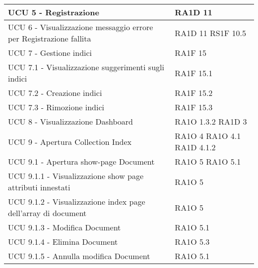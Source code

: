 \begin{center}
\begin{longtable}{ | p{5cm} | p{5cm} |}
            UCU 5 - Registrazione &  RA1D 11 \newline  \\ \hline      
            UCU 6 - Visualizzazione messaggio errore per Registrazione fallita &  RA1D 11 \newline  RS1F 10.5 \newline  \\ \hline      
            UCU 7 - Gestione indici &  RA1F 15 \newline  \\ \hline      
            UCU 7.1 - Visualizzazione suggerimenti sugli indici &  RA1F 15.1 \newline  \\ \hline      
            UCU 7.2 - Creazione indici &  RA1F 15.2 \newline  \\ \hline      
            UCU 7.3  - Rimozione indici &  RA1F 15.3 \newline  \\ \hline      
            UCU 8 - Visualizzazione Dashboard &  RA1O 1.3.2 \newline  RA1D 3 \newline  \\ \hline      
            UCU 9 - Apertura Collection Index &  RA1O 4 \newline  RA1O 4.1 \newline  RA1D 4.1.2 \newline  \\ \hline      
            UCU 9.1 - Apertura show-page Document &  RA1O 5 \newline  RA1O 5.1 \newline  \\ \hline      
            UCU 9.1.1 - Visualizzazione show page attributi innestati &  RA1O 5 \newline  \\ \hline      
            UCU 9.1.2 - Visualizzazione index page dell'array di document &  RA1O 5 \newline  \\ \hline      
            UCU 9.1.3 - Modifica Document &  RA1O 5.1 \newline  \\ \hline      
            UCU 9.1.4 - Elimina Document &  RA1O 5.3 \newline  \\ \hline      
            UCU 9.1.5 - Annulla modifica Document &  RA1O 5.1 \newline  \\ \hline      

\end{longtable}
\end{center}

